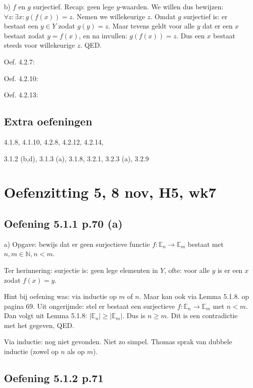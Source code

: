 \documentclass{article}
\begin{document}
b) $f$ en $g$ surjectief. Recap: geen lege $y$-waarden. We willen dus bewijzen: $\forall z: \exists x: g(f(x)) = z$. Nemen we willekeurige $z$. Omdat $g$ surjectief is: er bestaat een $y \in Y$ zodat $g(y)=z$. Maar tevens geldt voor alle $y$ dat er een $x$ bestaat zodat $y=f(x)$, en na invullen: $g(f(x))=z$. Dus een $x$ bestaat steeds voor willekeurige $z$. QED. 



Oef. 4.2.7: 

Oef. 4.2.10: 

Oef. 4.2.13: 


\subsection{Extra oefeningen}

 4.1.8, 4.1.10, 4.2.8, 4.2.12, 4.2.14,

3.1.2 (b,d), 3.1.3 (a), 3.1.8, 3.2.1, 3.2.3 (a), 3.2.9


\section{Oefenzitting 5, 8 nov, H5, wk7}

\subsection{Oefening 5.1.1 p.70 (a)} 

a) Opgave: bewijs dat er geen surjectieve functie $f: \mathbb{E}_n \rightarrow \mathbb{E}_m$ bestaat met $n,m \in \mathbb{N}, n <m$. 

Ter herinnering: surjectie is: geen lege elementen in $Y$, ofte: voor alle $y$ is er een $x$ zodat $f(x)=y$. 

Hint bij oefening was: via inductie op $m$ of $n$. Maar kan ook via Lemma 5.1.8. op pagina 69. Uit ongerijmde: stel er bestaat een surjectieve $f: \mathbb{E}_n \rightarrow \mathbb{E}_m$ met $n<m$. Dan volgt uit Lemma 5.1.8: $|\mathbb{E}_n | \geq | \mathbb{E}_m |$. Dus is $n \geq m$. Dit is een contradictie met het gegeven, QED. 

Via inductie: nog niet gevonden. Niet zo simpel. Thomas sprak van dubbele inductie (zowel op $n$ als op $m$). 



\subsection{Oefening 5.1.2 p.71}
\end{document}
